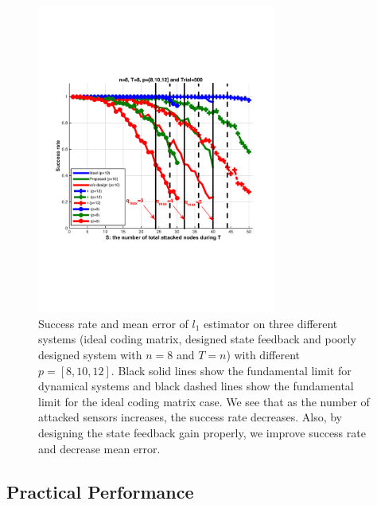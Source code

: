 \documentclass[../../thesis.tex]{subfiles}
\begin{document}
\begin{figure}
\center
\includegraphics[width=0.7\textwidth]{chapters/se_linear/figures/performance_overall.pdf}
\caption{Success rate and mean error of $l_1$ estimator on three different systems (ideal coding matrix, designed state feedback and poorly designed system with $n=8$ and $T=n$) with different $p=[8,10,12]$. Black solid lines show the fundamental limit for dynamical systems and black dashed lines show the fundamental limit for the ideal coding matrix case. We see that as the number of attacked sensors increases, the success rate decreases. Also, by designing the state feedback gain properly, we improve success rate and decrease mean error. }
\label{fig:ex_n8_overall}
\end{figure}




\subsection{Practical Performance}\label{sec:prac_perf}
\end{document}
